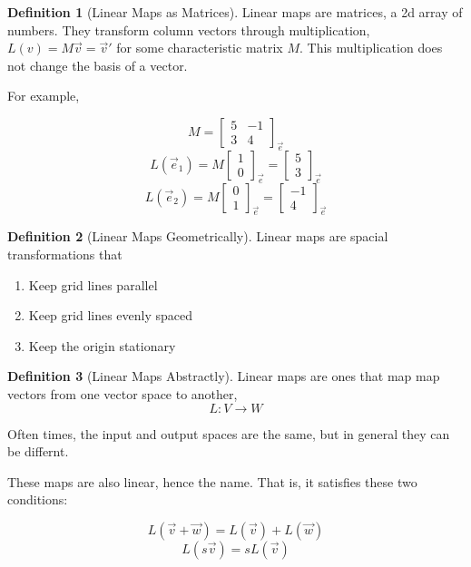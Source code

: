 \documentclass[12pt]{book}
\theoremstyle{plain}
\theoremstyle{definition}
\newtheorem{definition}{Definition}[chapter]
\theoremstyle{ppart}
\theoremstyle{case}
\theoremstyle{solution}
\begin{document}
\begin{definition}[Linear Maps as Matrices]
Linear maps are matrices, a 2d array of numbers. They transform column vectors through
multiplication, $L(v) = M \vec{v} = \vec{v}'$ for some characteristic matrix $M$.
This multiplication does not change the basis of a vector.

For example,

\[
  M =
  \begin{bmatrix}
  5 & -1 \\
  3 & 4
  \end{bmatrix}_{\vec{e}}
\]
\[
  L(\vec{e}_1) =
  M 
  \begin{bmatrix}
  1 \\
  0
  \end{bmatrix}_{\vec{e}}
  =
  \begin{bmatrix}
  5 \\
  3
  \end{bmatrix}_{\vec{e}}
\]
\[
  L(\vec{e}_2) =
  M 
  \begin{bmatrix}
  0 \\
  1
  \end{bmatrix}_{\vec{e}}
  =
  \begin{bmatrix}
  -1 \\
  4
  \end{bmatrix}_{\vec{e}}
\]
\end{definition}

\begin{definition}[Linear Maps Geometrically]
Linear maps are spacial transformations that
\begin{enumerate}
  \item Keep grid lines parallel
  \item Keep grid lines evenly spaced
  \item Keep the origin stationary
\end{enumerate}
\end{definition}

\begin{definition}[Linear Maps Abstractly]
Linear maps are ones that map map vectors from one vector space to another,
\[ L : V \to W \]

Often times, the input and output spaces are the same, but in general they can
be differnt.

These maps are also linear, hence the name. That is, it satisfies these two conditions:

\[ L(\vec{v} + \vec{w}) = L(\vec{v}) + L(\vec{w}) \]
\[ L(s \vec{v}) = s L(\vec{v}) \]
\end{definition}
\end{document}

